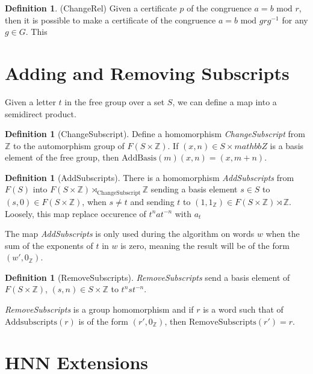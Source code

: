 \documentclass[11pt]{article} %
\theoremstyle{definition}
\theoremstyle{definition}
\theoremstyle{definition}
\theoremstyle{definition}
\theoremstyle{definition}
\newtheorem{defn}[theorem]{Definition}
\theoremstyle{definition}
\newtheorem{subdef}{Definition}[theorem]
\begin{document}
\begin{subdef}(ChangeRel)
  Given a certificate $p$ of the congruence $a = b \text{ mod } r$, then it is possible
  to make a certificate of the congruence $a = b \text{ mod } g r g^{-1}$ for any $g \in G$.
  This
\end{subdef}

\section{Adding and Removing Subscripts}

Given a letter $t$ in the free group over a set $S$, we can define a map into a
semidirect product.

\begin{defn}[ChangeSubscript]\label{changesubscript}
  Define a homomorphism \textit{ChangeSubscript} from $\mathbb{Z}$ to the automorphism
  group of $F(S \times \mathbb{Z})$. If $(x, n) \in S \times mathbb{Z}$ is a basis
  element of the free group, then $\text{AddBasis}(m)(x, n) = (x, m + n)$.
\end{defn}

\begin{defn}[AddSubscripts]\label{AddSubscripts}
  There is a homomorphism \textit{AddSubscripts} from $F(S)$ into $F(S \times \mathbb{Z})
  \rtimes_{\text{ChangeSubscript}} \mathbb{Z}$ sending a basis element $s \in S$ to
  $(s, 0) \in F(S \times \mathbb{Z})$, when $s \ne t$ and sending $t$ to
  $(1, 1_\mathbb{Z}) \in F(S \times \mathbb{Z}) \rtimes \mathbb{Z}$. Loosely, this map
  replace occurence of $t^n at^{-n}$ with $a_t$
\end{defn}

The map \textit{AddSubscripts} is only used during the algorithm on words $w$ when the sum of the
exponents of $t$ in $w$ is zero, meaning the result will be of the form $(w', 0_{\mathbb{Z}})$.

\begin{defn}[RemoveSubscripts]
  \textit{RemoveSubscripts} send a basis element of $F(S\times \mathbb{Z})$,  $(s, n) \in S\times \mathbb{Z}$
  to $t^n s t^{-n}$.
\end{defn}
\textit{RemoveSubscripts} is a group homomorphism and if $r$ is a word such that
of $\text{Addsubscripts}(r)$ is of the form $(r', 0_\mathbb{Z})$, then $\text{RemoveSubscripts}(r')=r$.

\section{HNN Extensions}\label{HNN}
\end{document}

